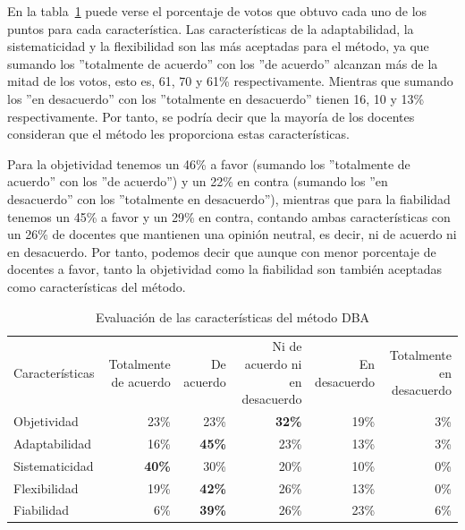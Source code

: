 En la tabla~\ref{tab:cap:encuesta:metodoDBA:caracteristicas} puede verse el porcentaje de votos que obtuvo cada uno de los puntos para cada característica. Las características de la adaptabilidad, la sistematicidad y la flexibilidad son las más aceptadas para el método, ya que sumando los ''totalmente de acuerdo'' con los ''de acuerdo'' alcanzan más de la mitad de los votos, esto es, 61, 70 y 61\% respectivamente. Mientras que sumando los ''en desacuerdo'' con los ''totalmente en desacuerdo'' tienen 16, 10 y 13\% respectivamente. Por tanto, se podría decir que la mayoría de los docentes consideran que el método les proporciona estas características.

Para la objetividad tenemos un 46\% a favor (sumando los ''totalmente de acuerdo'' con los ''de acuerdo'') y un 22\% en contra (sumando los ''en desacuerdo'' con los ''totalmente en desacuerdo''), mientras que para la fiabilidad tenemos un 45\% a favor y un 29\% en contra, contando ambas características con un 26\% de docentes que mantienen una opinión neutral, es decir, ni de acuerdo ni en desacuerdo. Por tanto, podemos decir que aunque con menor porcentaje de docentes a favor, tanto la objetividad como la fiabilidad son también aceptadas como características del método.

\begin{table}
  \begin{center}
  \begin{tabular}{| l | r | r | r | r | r |}
    \hline
    \multirow{3}{1.9cm}{Características} & \multirow{3}{1.9cm}{\centering Totalmente de acuerdo} & \multirow{3}{1.2cm}{\centering De acuerdo} & \multirow{3}{2.3cm}{\centering Ni de acuerdo ni en desacuerdo} & \multirow{3}{1.8cm}{\centering En desacuerdo} & \multirow{3}{1.9cm}{\centering Totalmente en desacuerdo} \\
    & & & & & \\
    & & & & & \\
    \hline
    \hline
    Objetividad & 23\% & 23\% & \textbf{32\%} & 19\% & 3\% \\
    \hline
    Adaptabilidad & 16\% & \textbf{45\%} & 23\% & 13\% & 3\% \\
    \hline
    Sistematicidad & \textbf{40\%} & 30\% & 20\% & 10\% & 0\% \\
    \hline
    Flexibilidad & 19\% & \textbf{42\%} & 26\% & 13\% & 0\% \\
    \hline
    Fiabilidad & 6\% & \textbf{39\%} & 26\% & 23\% & 6\% \\
    \hline
  \end{tabular}
\end{center}
\caption{Evaluación de las características del método DBA}
\label{tab:cap:encuesta:metodoDBA:caracteristicas}
\end{table}

